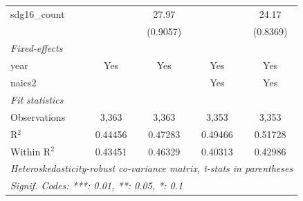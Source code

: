 \begin{tabular}{lcccc}
   sdg16\_count      &                & 27.97          &                & 24.17\\   
                     &                & (0.9057)       &                & (0.8369)\\   
   \midrule
   \emph{Fixed-effects}\\
   year              & Yes            & Yes            & Yes            & Yes\\  
   naics2            &                &                & Yes            & Yes\\  
   \midrule
   \emph{Fit statistics}\\
   Observations      & 3,363          & 3,363          & 3,353          & 3,353\\  
   R$^2$             & 0.44456        & 0.47283        & 0.49466        & 0.51728\\  
   Within R$^2$      & 0.43451        & 0.46329        & 0.40313        & 0.42986\\  
   \midrule \midrule
   \multicolumn{5}{l}{\emph{Heteroskedasticity-robust co-variance matrix, t-stats in parentheses}}\\
   \multicolumn{5}{l}{\emph{Signif. Codes: ***: 0.01, **: 0.05, *: 0.1}}\\
\end{tabular}
\par\endgroup


